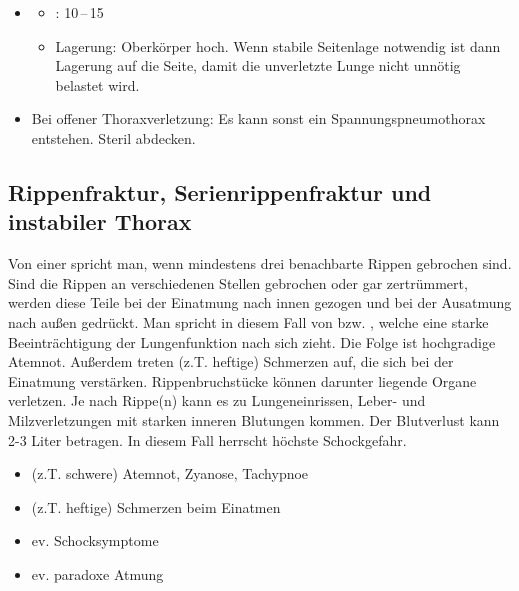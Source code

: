 {
\begin{itemize}
  \item \TxMassVitBes
  \begin{itemize}
    \item {}: 10\,--\,15\LMin
    \item Lagerung: Oberkörper hoch. Wenn stabile
    Seitenlage notwendig ist dann Lagerung auf die
     Seite, damit die unverletzte
    Lunge  nicht unnötig belastet wird.
  \end{itemize}
  \item Bei offener Thoraxverletzung:  Es kann sonst ein
  Spannungspneumothorax entstehen. Steril abdecken.
\end{itemize}
}




\subsection{Rippenfraktur, Serienrippenfraktur und instabiler Thorax}
\label{topic:serienrippenfraktur}

{
Von einer  spricht man,
wenn mindestens drei benachbarte Rippen gebrochen sind. Sind
die Rippen an verschiedenen Stellen gebrochen oder gar
zertrümmert, werden diese Teile bei der Einatmung nach innen
gezogen und bei der Ausatmung nach außen gedrückt. Man
spricht in diesem Fall von  bzw.
, welche eine starke Beeinträchtigung
der Lungenfunktion nach sich zieht. Die Folge ist hochgradige
Atemnot. Außerdem treten (z.T. heftige) Schmerzen auf, die
sich bei der Einatmung verstärken. Rippenbruchstücke können
darunter liegende Organe verletzen. Je nach Rippe(n) kann es
zu Lungeneinrissen, Leber- und Milzverletzungen mit starken
inneren Blutungen kommen. Der Blutverlust kann 2-3 Liter
betragen. \cite{LPN3} In diesem Fall herrscht höchste
Schockgefahr.
}{
\begin{itemize}
  \item (z.T. schwere) Atemnot, Zyanose, Tachypnoe
  \item (z.T. heftige) Schmerzen beim Einatmen
  \item ev. Schocksymptome
  \item ev. paradoxe Atmung
\end{itemize}
}{}{}{}

